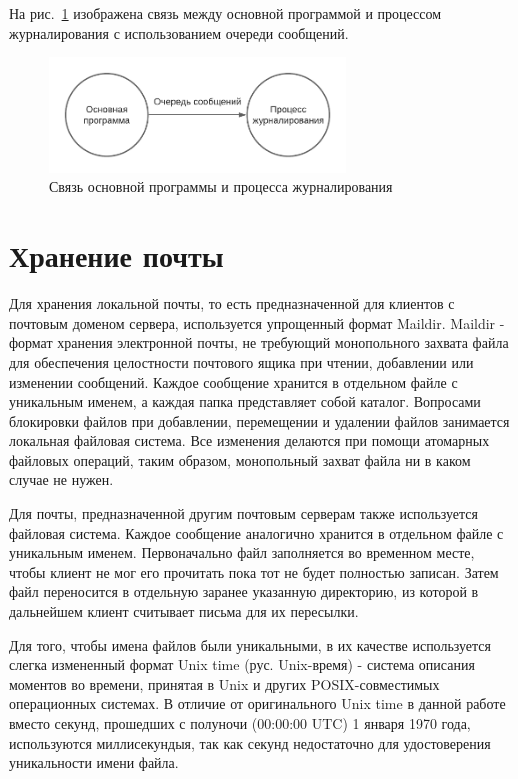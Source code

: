 \documentclass[a4paper,12pt]{report}
\begin{document}
На рис.~\ref{fig:ipc} изображена связь между основной программой и процессом журналирования с использованием очереди сообщений.

\begin{figure}[h]
    \centering
    \includegraphics[width=0.7\textwidth]{pics/ipc.pdf}
    \caption{Связь основной программы и процесса журналирования}
    \label{fig:ipc}
\end{figure}


\section{Хранение почты}

Для хранения локальной почты, то есть предназначенной для клиентов с почтовым доменом сервера, используется упрощенный формат Maildir. Maildir - формат хранения электронной почты, не требующий монопольного захвата файла для обеспечения целостности почтового ящика при чтении, добавлении или изменении сообщений. Каждое сообщение хранится в отдельном файле с уникальным именем, а каждая папка представляет собой каталог. Вопросами блокировки файлов при добавлении, перемещении и удалении файлов занимается локальная файловая система. Все изменения делаются при помощи атомарных файловых операций, таким образом, монопольный захват файла ни в каком случае не нужен.

Для почты, предназначенной другим почтовым серверам также используется файловая система. Каждое сообщение аналогично хранится в отдельном файле с уникальным именем. Первоначально файл заполняется во временном месте, чтобы клиент не мог его прочитать пока тот не будет полностью записан. Затем файл переносится в отдельную заранее указанную директорию, из которой в дальнейшем клиент считывает письма для их пересылки. 

Для того, чтобы имена файлов были уникальными, в их качестве используется слегка измененный формат Unix time (рус. Unix-время) - система описания моментов во времени, принятая в Unix и других POSIX-совместимых операционных системах. В отличие от оригинального Unix time в данной работе вместо секунд, прошедших с полуночи (00:00:00 UTC) 1 января 1970 года, используются миллисекундыя, так как секунд недостаточно для удостоверения уникальности имени файла.
\end{document}
